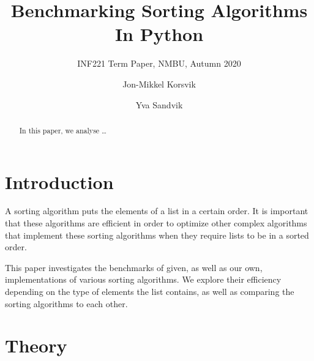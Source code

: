 \documentclass[sigconf, nonacm, natbib, screen, balance=False]{acmart}
\begin{document}
\title{Benchmarking Sorting Algorithms In Python}
\subtitle{INF221 Term Paper, NMBU, Autumn 2020}

\author{Jon-Mikkel Korsvik}
\affiliation{}  %

\author{Yva Sandvik}

\begin{abstract}
  In this paper, we analyse \dots 
\end{abstract}


\maketitle

\section{Introduction}\label{sec:intro}

A sorting algorithm puts the elements of a list in a certain order. It is important that these algorithms are efficient in order to optimize other complex algorithms that implement these sorting algorithms when they require lists to be in a sorted order. 

This paper investigates the benchmarks of given, as well as our own, implementations of various sorting algorithms. We explore their efficiency depending on the type of elements the list contains, as well as comparing the sorting algorithms to each other.

\section{Theory}\label{sec:theory}
\end{document}
